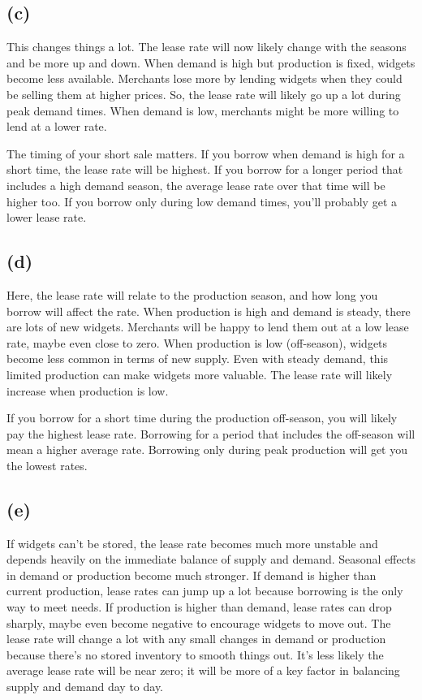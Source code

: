 \subsection{(c)}\label{c}

This changes things a lot. The lease rate will now likely change with
the seasons and be more up and down. When demand is high but production
is fixed, widgets become less available. Merchants lose more by lending
widgets when they could be selling them at higher prices. So, the lease
rate will likely go up a lot during peak demand times. When demand is
low, merchants might be more willing to lend at a lower rate.

The timing of your short sale matters. If you borrow when demand is high
for a short time, the lease rate will be highest. If you borrow for a
longer period that includes a high demand season, the average lease rate
over that time will be higher too. If you borrow only during low demand
times, you'll probably get a lower lease rate.

\subsection{(d)}\label{d}

Here, the lease rate will relate to the production season, and how long
you borrow will affect the rate. When production is high and demand is
steady, there are lots of new widgets. Merchants will be happy to lend
them out at a low lease rate, maybe even close to zero. When production
is low (off-season), widgets become less common in terms of new supply.
Even with steady demand, this limited production can make widgets more
valuable. The lease rate will likely increase when production is low.

If you borrow for a short time during the production off-season, you
will likely pay the highest lease rate. Borrowing for a period that
includes the off-season will mean a higher average rate. Borrowing only
during peak production will get you the lowest rates.

\subsection{(e)}\label{e}

If widgets can't be stored, the lease rate becomes much more unstable
and depends heavily on the immediate balance of supply and demand.
Seasonal effects in demand or production become much stronger. If demand
is higher than current production, lease rates can jump up a lot because
borrowing is the only way to meet needs. If production is higher than
demand, lease rates can drop sharply, maybe even become negative to
encourage widgets to move out. The lease rate will change a lot with any
small changes in demand or production because there's no stored
inventory to smooth things out. It's less likely the average lease rate
will be near zero; it will be more of a key factor in balancing supply
and demand day to day.

